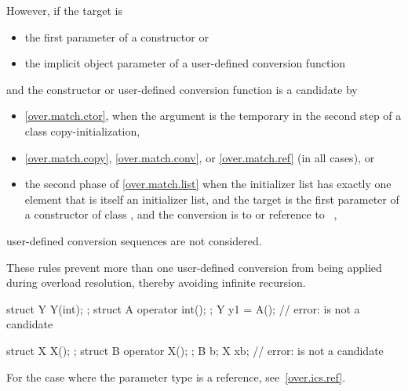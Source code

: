 \pnum
However, if the target is
\begin{itemize}
\item the first parameter of a constructor or
\item the implicit object parameter of a user-defined conversion function
\end{itemize}
and the constructor or user-defined conversion function is a candidate by
\begin{itemize}
\item \ref{over.match.ctor}, when the argument is the temporary in the second
step of a class copy-initialization,
\item \ref{over.match.copy}, \ref{over.match.conv}, or \ref{over.match.ref}
(in all cases), or
\item the second phase of \ref{over.match.list}
when the initializer list has exactly one element that
is itself an initializer list, and
the target is the first parameter of a constructor of class , and
the conversion is to  or reference to \cv{}~,
\end{itemize}
user-defined conversion sequences are not considered.
\begin{note}
These rules prevent more than one user-defined conversion from being
applied during overload resolution, thereby avoiding infinite recursion.
\end{note}
\begin{example}
\begin{codeblock}
  struct Y { Y(int); };
  struct A { operator int(); };
  Y y1 = A();       // error:  is not a candidate

  struct X { X(); };
  struct B { operator X(); };
  B b;
  X x{{b}};         // error:  is not a candidate
\end{codeblock}
\end{example}

\pnum
For the case where the parameter type is a reference, see~\ref{over.ics.ref}.

